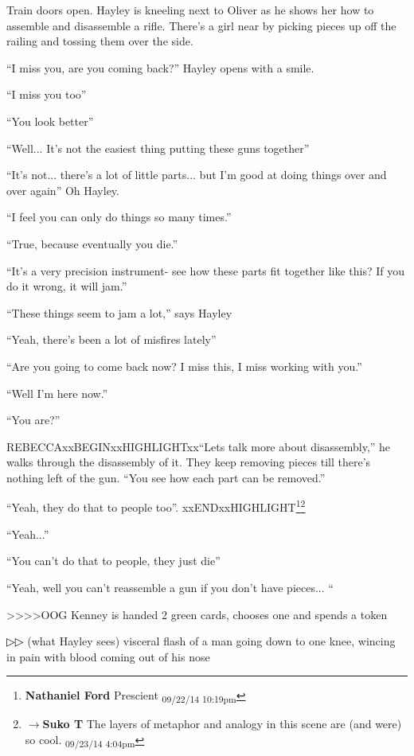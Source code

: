 Train doors open.  Hayley is kneeling next to Oliver as he shows her how to assemble and disassemble a rifle.  There's a girl near by picking pieces up off the railing and tossing them over the side. 



``I miss you, are you coming back?'' Hayley opens with a smile.

``I miss you too''

``You look better''

``Well... It's not the easiest thing putting these guns together''

``It's not...  there's a lot of little parts... but I'm good at doing things over and over again'' Oh Hayley.

``I feel you can only do things so many times.''

``True, because eventually you die.''

``It's a very precision instrument- see how these parts fit together like this?  If you do it wrong, it will jam.''

``These things seem to jam a lot,'' says Hayley

``Yeah, there's been a lot of misfires lately''

``Are you going to come back now?  I miss this, I miss working with you.''

``Well I'm here now.''

``You are?''

REBECCAxxBEGINxxHIGHLIGHTxx``Lets talk more about disassembly,'' he walks through the disassembly of it. They keep removing pieces till there's nothing left of the gun.  ``You see how each part can be removed.''

``Yeah, they do that to people too''. xxENDxxHIGHLIGHT\footnote{\textbf{Nathaniel Ford }Prescient \textsubscript{09/22/14 10:19pm}}\footnote{$\rightarrow$\textbf{Suko T }The layers of metaphor and analogy in this scene are (and were) so cool. \textsubscript{09/23/14 4:04pm}}

``Yeah...''

``You can't do that to people, they just die''

``Yeah, well you can't reassemble a gun if you don't have pieces... ``



\textgreater \textgreater \textgreater \textgreater   OOG Kenney is handed 2 green cards, chooses one and spends a token

▷▷ (what Hayley sees) visceral flash of a man going down to one knee, wincing in pain with blood coming out of his nose



